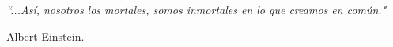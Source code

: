 \documentclass[letterpaper,11pt]{report}
\begin{document}
\emph{\textquotedblleft ...As\'i, nosotros los mortales, somos
inmortales en lo que creamos en com\'un."}

\begin{flushright}
Albert Einstein.
\end{flushright}
\newpage

\tableofcontents
{}
\setcounter{page}{1}




%
%
%

%
%
%
\appendix


\end{document}
